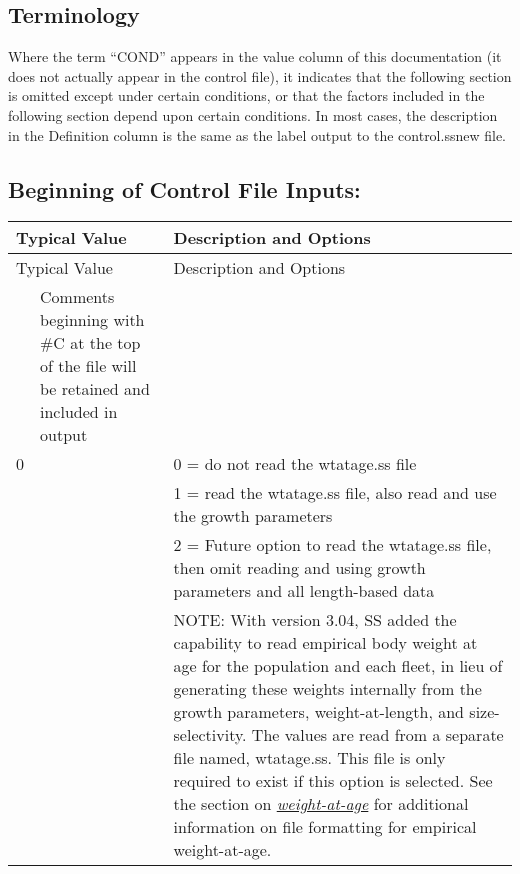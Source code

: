 \subsection{Terminology}
Where the term “COND” appears in the value column of this documentation (it does not actually appear in the control file), it indicates that the following section is omitted except under certain conditions, or that the factors included in the following section depend upon certain conditions.
In most cases, the description in the Definition column is the same as the label output to the control.ss\textunderscore new file.

\subsection{Beginning of Control File Inputs:}
\begin{center}

	\begin{longtable}{p{0.5cm} p{2cm} p{12cm}}

		\multicolumn{2}{l}{Typical Value} & Description and Options\\
		\hline
		\endfirsthead

		\multicolumn{2}{l}{Typical Value} & Description and Options\\
		\hline
		\endhead

		\hline
		\endfoot

		\endlastfoot

		\multicolumn{2}{l}{\#C comment } & Comments beginning with \#C at the top of the file will be retained and included in output  \\
		\hline

		0 & & 0 = do not read the wtatage.ss file \\
		  & & 1 = read the wtatage.ss file, also read and use the growth parameters \\
		  & & 2 = Future option to read the wtatage.ss file, then omit reading and using growth parameters and all length-based data\\
		  & &   NOTE:  With version 3.04, SS added the capability to read empirical body weight at age for the population and each fleet, in lieu of generating these weights internally from the growth parameters, weight-at-length, and size-selectivity.  The values are read from a separate file named, wtatage.ss.  This file is only required to exist if this option is selected.  See the section on \hyperlink{WAA}{\textit{weight-at-age}} for additional information on file formatting for empirical weight-at-age.\\



\end{longtable}
\end{center}
